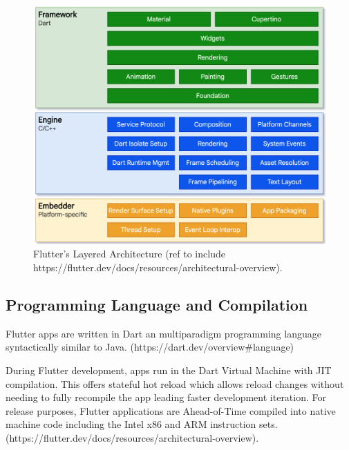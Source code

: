 \begin{figure}
    \includegraphics[width=\linewidth]{images/flutter_layered_architecture.png}
    \caption{Flutter's Layered Architecture (ref to include https://flutter.dev/docs/resources/architectural-overview).}
    \label{fig:native_architecture}
\end{figure}


\subsection{Programming Language and Compilation}
Flutter apps are written in Dart an multiparadigm programming language syntactically similar to Java. (https://dart.dev/overview\#language)

During Flutter development, apps run in the Dart Virtual Machine with JIT compilation. This offers stateful hot reload which allows reload changes without needing 
to fully recompile the app leading faster development iteration.
For release purposes, Flutter applications are Ahead-of-Time compiled into native machine code including the Intel x86 and ARM instruction sets.
(https://flutter.dev/docs/resources/architectural-overview).


